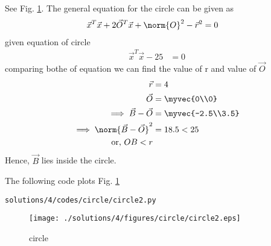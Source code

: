See Fig. 	\ref{fig:4.2.4_circle}.  The  general equation for the circle can be given as
\begin{align}
\vec{x}^T\vec{x} + 2\vec{O}^T\vec{x} +\norm{O}^2 - \vec{r}^2 &= 0
\end{align}
given equation of circle
\begin{align}
\vec{x}^T\vec{x} -25&= 0
\end{align} 
comparing bothe of equation we can find the value of r and value of  $\vec{O}$
\begin{align}
\vec{r}&= 4
\\
\vec{O} &= \myvec{0\\0}
\\
\implies \vec{B}-\vec{O} &= \myvec{-2.5\\3.5}
\\
\implies \norm{\vec{B} - \vec{O}}^2 &= 18.5 < 25
\\
\text{or, } OB < r&
\end{align} 
Hence, $\vec{B}$ lies inside the circle.

The following code plots Fig. 	\ref{fig:4.2.4_circle}

	\begin{lstlisting}
solutions/4/codes/circle/circle2.py
	\end{lstlisting}
\begin{figure}[!ht]
	\centering
	\texttt{[image: ./solutions/4/figures/circle/circle2.eps]}
	\caption{circle }
	\label{fig:4.2.4_circle}
\end{figure}
